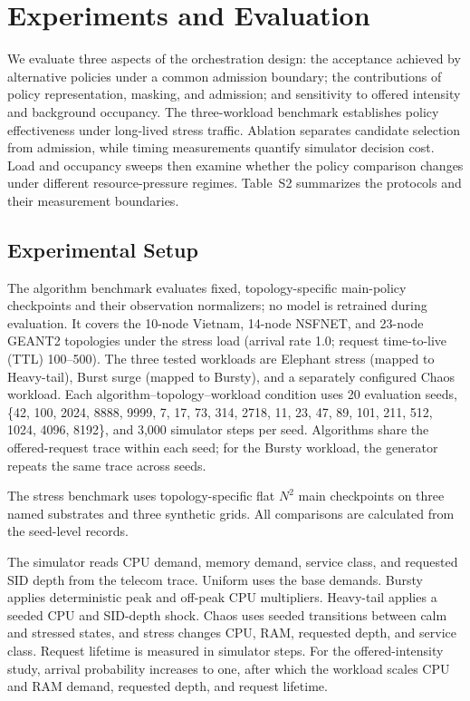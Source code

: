 \documentclass[final,5p]{elsarticle}
\newcommand{\rev}[1]{\textcolor{revisiongreen}{#1}}
\let\newrev\rev
\begin{document}
\section{Experiments and Evaluation}
\label{sec:evaluation}
\newrev{We evaluate three aspects of the orchestration design: the acceptance achieved by alternative policies under a common admission boundary; the contributions of policy representation, masking, and admission; and sensitivity to offered intensity and background occupancy. The three-workload benchmark establishes policy effectiveness under long-lived stress traffic. Ablation separates candidate selection from admission, while timing measurements quantify simulator decision cost. Load and occupancy sweeps then examine whether the policy comparison changes under different resource-pressure regimes. Table~S2 summarizes the protocols and their measurement boundaries.}

\subsection{\newrev{Experimental Setup}}
\label{subsec:experimental_setup}
\newrev{The algorithm benchmark evaluates fixed, topology-specific main-policy checkpoints and their observation normalizers; no model is retrained during evaluation. It covers the 10-node Vietnam, 14-node NSFNET, and 23-node GEANT2 topologies under the stress load (arrival rate 1.0; request time-to-live (TTL) 100--500). The three tested workloads are Elephant stress (mapped to Heavy-tail), Burst surge (mapped to Bursty), and a separately configured Chaos workload. Each algorithm--topology--workload condition uses 20 evaluation seeds, \{42, 100, 2024, 8888, 9999, 7, 17, 73, 314, 2718, 11, 23, 47, 89, 101, 211, 512, 1024, 4096, 8192\}, and 3,000 simulator steps per seed. Algorithms share the offered-request trace within each seed; for the Bursty workload, the generator repeats the same trace across seeds.}

\newrev{The stress benchmark uses topology-specific flat \(N^2\) main checkpoints on three named substrates and three synthetic grids. All comparisons are calculated from the seed-level records.}

\newrev{The simulator reads CPU demand, memory demand, service class, and requested SID depth from the telecom trace. Uniform uses the base demands. Bursty applies deterministic peak and off-peak CPU multipliers. Heavy-tail applies a seeded CPU and SID-depth shock. Chaos uses seeded transitions between calm and stressed states, and stress changes CPU, RAM, requested depth, and service class. Request lifetime is measured in simulator steps. For the offered-intensity study, arrival probability increases to one, after which the workload scales CPU and RAM demand, requested depth, and request lifetime.}
\end{document}
